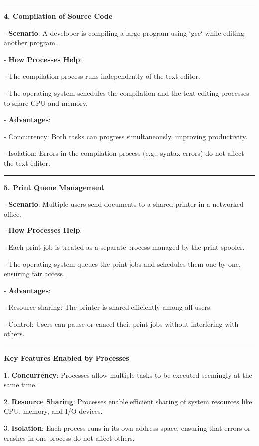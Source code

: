 \documentclass[a4paper]{book}
\begin{document}
\rule{0.75\textwidth}{0.5pt}

\textbf{4. Compilation of Source Code}

   - \textbf{Scenario}: A developer is compiling a large program using `gcc` while editing another program.
   
   - \textbf{How Processes Help}:
     
     - The compilation process runs independently of the text editor.
     
     - The operating system schedules the compilation and the text editing processes to share CPU and memory.
   
   - \textbf{Advantages}:
     
     - Concurrency: Both tasks can progress simultaneously, improving productivity.
     
     - Isolation: Errors in the compilation process (e.g., syntax errors) do not affect the text editor.

\rule{0.75\textwidth}{0.5pt}

\textbf{5. Print Queue Management}

   - \textbf{Scenario}: Multiple users send documents to a shared printer in a networked office.
   
   - \textbf{How Processes Help}:
     
     - Each print job is treated as a separate process managed by the print spooler.
     
     - The operating system queues the print jobs and schedules them one by one, ensuring fair access.
   
   - \textbf{Advantages}:
     
     - Resource sharing: The printer is shared efficiently among all users.
     
     - Control: Users can pause or cancel their print jobs without interfering with others.

\rule{0.75\textwidth}{0.5pt}

\textbf{Key Features Enabled by Processes}


1. \textbf{Concurrency}: Processes allow multiple tasks to be executed seemingly at the same time.

2. \textbf{Resource Sharing}: Processes enable efficient sharing of system resources like CPU, memory, and I/O devices.

3. \textbf{Isolation}: Each process runs in its own address space, ensuring that errors or crashes in one process do not affect others.
\end{document}
